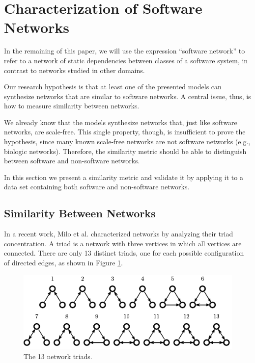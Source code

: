
\section{Characterization of Software Networks} \label{sec:characterization}

In the remaining of this paper, we will use the expression ``software network''
to refer to a network of static dependencies between classes of a software
system, in contrast to networks studied in other domains.

Our research hypothesis is that at least one of the presented models can
synthesize networks that are similar to software networks. A central issue,
thus, is how to measure similarity between networks.

We already know that the models synthesize networks that, just like software
networks, are scale-free. This single property, though, is insufficient to
prove the hypothesis, since many known scale-free networks are not software
networks (e.g., biologic networks). Therefore, the similarity metric should be
able to distinguish between software and non-software networks.

In this section we present a similarity metric and validate it by applying it
to a data set containing both software and non-software networks. 

\subsection{Similarity Between Networks}

In a recent work, Milo et al. \cite{Milo2004} characterized networks by
analyzing their triad concentration. A triad is a network with three vertices
in which all vertices are connected. There are only 13 distinct triads, one for
each possible configuration of directed edges, as shown in Figure
\ref{fig:triads}.

\begin{figure}[t]
\centering
\includegraphics{triads}
\caption{The 13 network triads.}
\label{fig:triads}
\end{figure}


